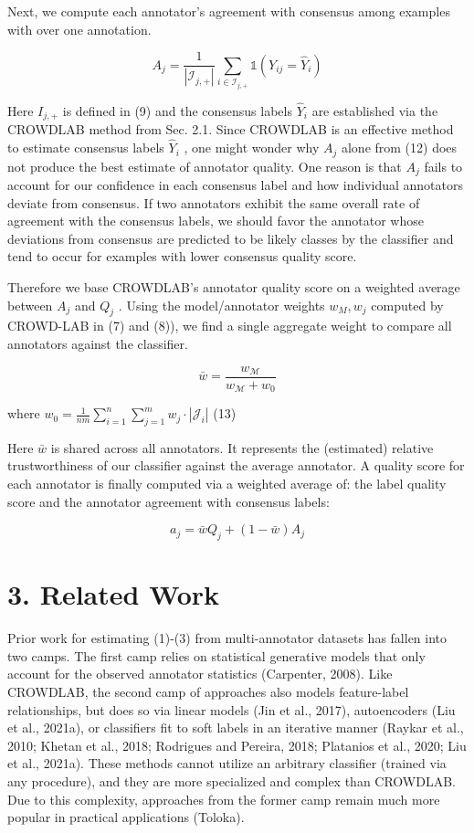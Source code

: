 \documentclass[
]{article}
\begin{document}
Next, we compute each annotator's agreement with consensus among
examples with over one annotation.

\[
A _ {j} = \frac {1}{\left| \mathcal {I} _ {j , +} \right|} \sum_ {i \in \mathcal {I} _ {j, +}} \mathbb {1} \left(Y _ {i j} = \widehat {Y} _ {i}\right) \tag {12}
\]

Here \(I_{j,+}\) is defined in (9) and the consensus labels
\(\widehat{Y}_{i}\) are established via the CROWDLAB method from Sec.
2.1. Since CROWDLAB is an effective method to estimate consensus labels
\(\widehat{Y}_{i}\) , one might wonder why \(A_{j}\) alone from (12)
does not produce the best estimate of annotator quality. One reason is
that \(A_{j}\) fails to account for our confidence in each consensus
label and how individual annotators deviate from consensus. If two
annotators exhibit the same overall rate of agreement with the consensus
labels, we should favor the annotator whose deviations from consensus
are predicted to be likely classes by the classifier and tend to occur
for examples with lower consensus quality score.

Therefore we base CROWDLAB's annotator quality score on a weighted
average between \(A_{j}\) and \(Q_{j}\) . Using the model/annotator
weights \(w_{M}, w_{j}\) computed by CROWD-LAB in (7) and (8)), we find
a single aggregate weight to compare all annotators against the
classifier.

\[
\bar {w} = \frac {w _ {\mathcal {M}}}{w _ {\mathcal {M}} + w _ {0}}
\]

where
\(w_{0}=\frac{1}{nm}\sum_{i=1}^{n}\sum_{j=1}^{m}w_{j}\cdot|\mathcal{J}_{i}|\)
(13)

Here \(\bar{w}\) is shared across all annotators. It represents the
(estimated) relative trustworthiness of our classifier against the
average annotator. A quality score for each annotator is finally
computed via a weighted average of: the label quality score and the
annotator agreement with consensus labels:

\[
a _ {j} = \bar {w} Q _ {j} + (1 - \bar {w}) A _ {j} \tag {14}
\]

\section{3. Related Work}\label{related-work}

Prior work for estimating (1)-(3) from multi-annotator datasets has
fallen into two camps. The first camp relies on statistical generative
models that only account for the observed annotator statistics
(Carpenter, 2008). Like CROWDLAB, the second camp of approaches also
models feature-label relationships, but does so via linear models (Jin
et al., 2017), autoencoders (Liu et al., 2021a), or classifiers fit to
soft labels in an iterative manner (Raykar et al., 2010; Khetan et al.,
2018; Rodrigues and Pereira, 2018; Platanios et al., 2020; Liu et al.,
2021a). These methods cannot utilize an arbitrary classifier (trained
via any procedure), and they are more specialized and complex than
CROWDLAB. Due to this complexity, approaches from the former camp remain
much more popular in practical applications (Toloka).
\end{document}
